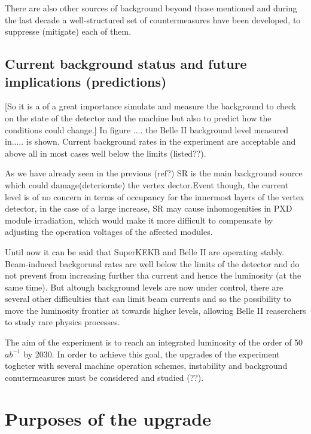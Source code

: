 There are also other sources of background beyond those mentioned and during the last decade a well-structured set of countermeasures have been developed, to suppresse (mitigate) each of them.

\subsection{Current background status and future implications (predictions)}

[So it is a of a great importance simulate and measure the background to check on the state of the detector and the machine but also to predict how the conditions could change.]
In figure .... the Belle II background level measured in..... is shown. Current background rates in the experiment are acceptable and above all in most cases well below the limits (listed??). 

As we have already seen in the previous (ref?) SR is the main background source which could  damage(deteriorate) the vertex dector.Event though, the current level is of no concern in terms of occupancy for the innermost layers of the vertex detector, in the case of a large increase, SR may cause inhomogenities in PXD module irradiation, which would make it more difficult to compensate by adjusting the operation voltages of the affected modules.


Until now it can be said that SuperKEKB and Belle II are operating stably. Beam-induced backgorund rates are well below the limits of the detector and do not prevent from increasing further tha current and hence the luminosity (at the same time).  
But altough background levels are now under control, there are several other difficulties that can limit beam currents and so the possibility to move the luminosity frontier at towards higher levels, allowing Belle II reaserchers to study rare physics processes. 

The aim of the experiment is to reach an integrated luminosity of the order of 50 $ab^{-1}$ by 2030. In order to achieve this goal, the upgrades of the experiment togheter with several machine operation schemes, instability and background conutermeasures must be considered and studied (??).


\newpage


\section{Purposes of the upgrade}

